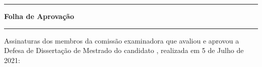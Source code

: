 \begin{folhadeaprovacao}
   \noindent\begin{minipage}{\textwidth}
      \begin{center}
      \rule{\linewidth}{1pt}
      \textbf{Folha de Aprovação}\\[-0.5em]
      \rule{\linewidth}{1pt}
      \end{center}
   \end{minipage}

   \begin{flushleft}
      Assinaturas dos membros da comissão examinadora que avaliou e aprovou a
      Defesa de Dissertação de Mestrado do candidato \imprimirautor{}, realizada
      em 5 de Julho de 2021:
   \end{flushleft}
 
       
   \vspace*{\fill}
   \begin{center}
      \vspace*{0.5cm}
      {\large\imprimirlocal}
      \par
      {\large\imprimirdata}
      \vspace*{1cm}
   \end{center}
\end{folhadeaprovacao}

